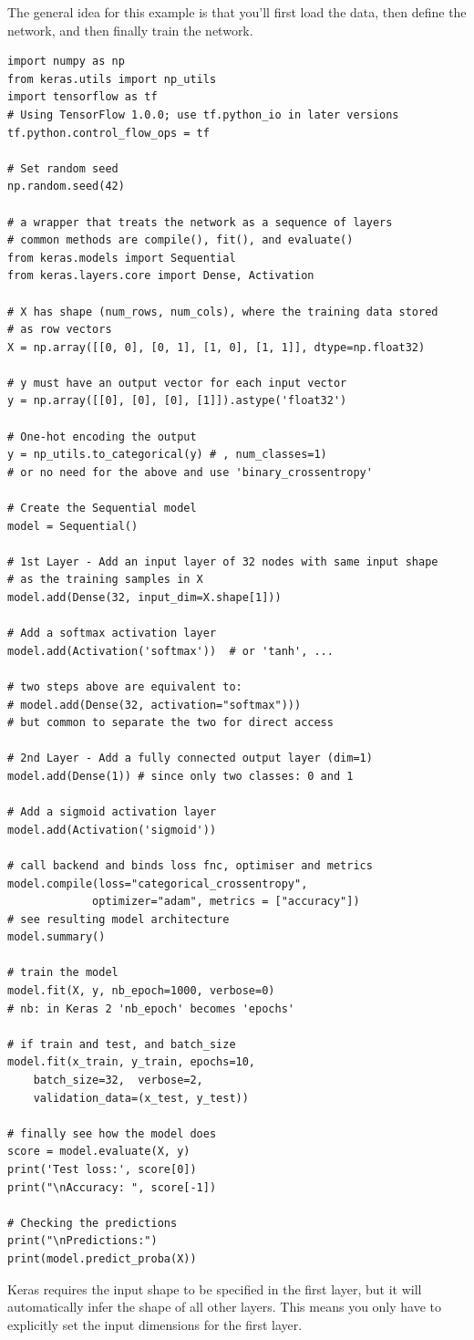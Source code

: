 \documentclass[11pt]{article}
\begin{document}
The general idea for this example is that you'll first load the data, then define the network, and then finally train the network.
\begin{lstlisting}
import numpy as np
from keras.utils import np_utils
import tensorflow as tf
# Using TensorFlow 1.0.0; use tf.python_io in later versions
tf.python.control_flow_ops = tf

# Set random seed
np.random.seed(42)

# a wrapper that treats the network as a sequence of layers
# common methods are compile(), fit(), and evaluate()
from keras.models import Sequential
from keras.layers.core import Dense, Activation

# X has shape (num_rows, num_cols), where the training data stored
# as row vectors
X = np.array([[0, 0], [0, 1], [1, 0], [1, 1]], dtype=np.float32)
    
# y must have an output vector for each input vector
y = np.array([[0], [0], [0], [1]]).astype('float32')

# One-hot encoding the output
y = np_utils.to_categorical(y) # , num_classes=1)
# or no need for the above and use 'binary_crossentropy'
    
# Create the Sequential model
model = Sequential()
    
# 1st Layer - Add an input layer of 32 nodes with same input shape 
# as the training samples in X
model.add(Dense(32, input_dim=X.shape[1]))
    
# Add a softmax activation layer
model.add(Activation('softmax'))  # or 'tanh', ...

# two steps above are equivalent to: 
# model.add(Dense(32, activation="softmax")))
# but common to separate the two for direct access

# 2nd Layer - Add a fully connected output layer (dim=1)
model.add(Dense(1)) # since only two classes: 0 and 1
    
# Add a sigmoid activation layer
model.add(Activation('sigmoid'))

# call backend and binds loss fnc, optimiser and metrics
model.compile(loss="categorical_crossentropy", 
			 optimizer="adam", metrics = ["accuracy"])
# see resulting model architecture
model.summary()

# train the model
model.fit(X, y, nb_epoch=1000, verbose=0)
# nb: in Keras 2 'nb_epoch' becomes 'epochs'

# if train and test, and batch_size
model.fit(x_train, y_train, epochs=10,  
	batch_size=32,	verbose=2,
	validation_data=(x_test, y_test))

# finally see how the model does
score = model.evaluate(X, y)
print('Test loss:', score[0])
print("\nAccuracy: ", score[-1])

# Checking the predictions
print("\nPredictions:")
print(model.predict_proba(X))
\end{lstlisting}
Keras requires the input shape to be specified in the first layer, but it will automatically infer the shape of all other layers. This means you only have to explicitly set the input dimensions for the first layer.
\end{document}
